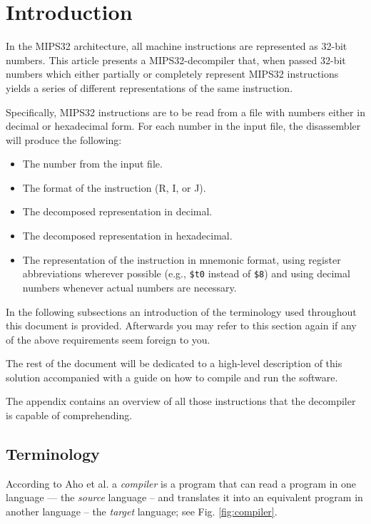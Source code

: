 \section{Introduction}

In the MIPS32 architecture, all machine instructions are represented
as 32-bit numbers. This article presents a MIPS32-decompiler that,
when passed 32-bit numbers which either partially or completely
represent MIPS32 instructions yields a series of different
representations of the same instruction.

Specifically, MIPS32 instructions are to be read from a file with
numbers either in decimal or hexadecimal form. For each number in the
input file, the disassembler will produce the following:

\begin{itemize}
  \item The number from the input file.
  \item The format of the instruction (R, I, or J).
  \item The decomposed representation in decimal.
  \item The decomposed representation in hexadecimal.
  \item The representation of the instruction in mnemonic format,
    using register abbreviations wherever possible (e.g.,
    \texttt{\$t0} instead of \texttt{\$8}) and using decimal numbers
    whenever actual numbers are necessary.
\end{itemize}

In the following subsections an introduction of the terminology used
throughout this document is provided. Afterwards you may refer to this
section again if any of the above requirements seem foreign to you.

The rest of the document will be dedicated to a high-level description
of this solution accompanied with a guide on how to compile and run
the software.

The appendix contains an overview of all those instructions that the
decompiler is capable of comprehending.

\subsection{Terminology}

According to Aho et al.  a \emph{compiler} is a program that
can read a program in one language --- the \emph{source} language --
and translates it into an equivalent program in another language --
the \emph{target} language; see Fig. \ref{fig:compiler}.

